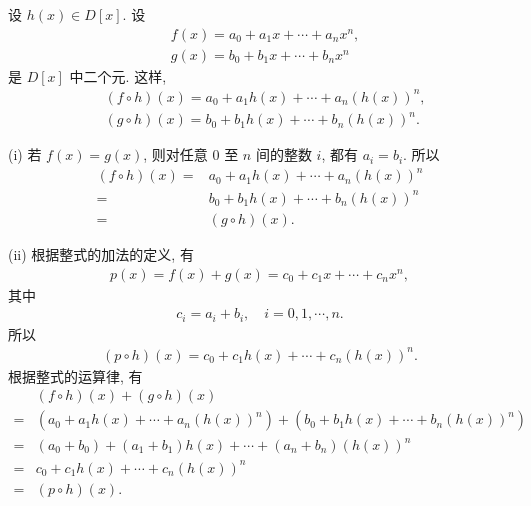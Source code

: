 \begin{pf}
    设 $h(x) \in D[x]$. 设
    \begin{align*}
         & f(x) = a_0 + a_1 x + \cdots + a_n x^n, \\
         & g(x) = b_0 + b_1 x + \cdots + b_n x^n
    \end{align*}
    是 $D[x]$ 中二个元. 这样,
    \begin{align*}
         & (f \circ h)(x) = a_0 + a_1 h(x) + \cdots + a_n (h(x))^n, \\
         & (g \circ h)(x) = b_0 + b_1 h(x) + \cdots + b_n (h(x))^n.
    \end{align*}

    (i) 若 $f(x) = g(x)$, 则对任意 $0$ 至 $n$ 间的整数 $i$, 都有 $a_i = b_i$. 所以
    \begin{align*}
        (f \circ h)(x)
        = {} & a_0 + a_1 h(x) + \cdots + a_n (h(x))^n \\
        = {} & b_0 + b_1 h(x) + \cdots + b_n (h(x))^n \\
        = {} & (g \circ h)(x).
    \end{align*}

    (ii) 根据整式的加法的定义, 有
    \begin{align*}
        p(x) = f(x) + g(x) = c_0 + c_1 x + \cdots + c_n x^n,
    \end{align*}
    其中
    \begin{align*}
        c_i = a_i + b_i, \quad i = 0,1,\cdots,n.
    \end{align*}
    所以
    \begin{align*}
        (p \circ h)(x) = c_0 + c_1 h(x) + \cdots + c_n (h(x))^n.
    \end{align*}
    根据整式的运算律, 有
    \begin{align*}
             & (f \circ h)(x) + (g \circ h)(x)                                                     \\
        = {} & (a_0 + a_1 h(x) + \cdots + a_n (h(x))^n) + (b_0 + b_1 h(x) + \cdots + b_n (h(x))^n) \\
        = {} & (a_0 + b_0) + (a_1 + b_1) h(x) + \cdots + (a_n + b_n) (h(x))^n                      \\
        = {} & c_0 + c_1 h(x) + \cdots + c_n (h(x))^n                                              \\
        = {} & (p \circ h)(x).
    \end{align*}


\end{pf}
